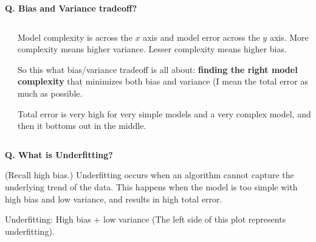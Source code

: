 \begin{frame}[fragile]{\textbf{Q. Bias and Variance tradeoff?}}
\begin{columns}[T]
\begin{column}{.58\textwidth}
{{      }
    }
  \end{column}
  \hfill
  \begin{column}{.4\textwidth}
    \footnotesize
    \begin{wideitemize}\footnotesize
    \item<1-> Model complexity is across the $x$ axis and model error across
    the $y$ axis. More complexity means higher variance. Lesser complexity
    means higher bias.
    \item<2-> So this what bias/variance tradeoff is all about: \textbf{finding
    the right model complexity} that minimizes both bias and variance (I mean
    the total error as much as possible.
    \item<3-> Total error is very high for very simple models and a very complex
    model, and then it bottoms out in the middle.
    \end{wideitemize}
    \end{column}
  \end{columns}
\end{frame}


\begin{frame}[fragile]{\textbf{Q. What is Underfitting?}}
  \begin{wideitemize}
    \item (Recall high bias.) Underfitting occurs when an algorithm
    cannot capture the underlying trend of the data. This happens
    when the model is too simple with high bias and low variance, and
    results in high total error.
    \item Underfitting: High bias + low variance (The left side of this plot represents underfitting).
  \end{wideitemize}
\end{frame}

